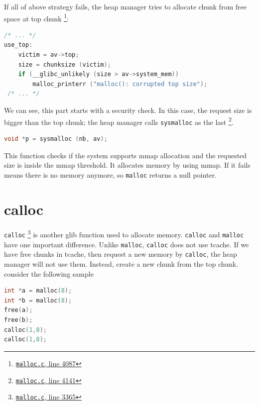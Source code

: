 \documentclass{masterthesis}
\newcommand*\tch{tcache}
\newcommand*\mallocc{\lstinline{malloc}}
\newcommand*\callocc{\lstinline{calloc}}
\begin{document}
If all of above strategy fails, the heap manager tries to allocate chunk from free space at top chunk \footnote{\href{https://sourceware.org/git/?p=glibc.git;a=blob;f=malloc/malloc.c;h=f7cd29bc2f93e1082ee77800bd64a4b2a2897055;hb=9ea3686266dca3f004ba874745a4087a89682617\#l4087}{\texttt{malloc.c}, line 4087}}:

\begin{lstlisting}[language=c,frame=tlrb]
 /* ... */
use_top:
	victim = av->top;
	size = chunksize (victim);
	if (__glibc_unlikely (size > av->system_mem))
		malloc_printerr ("malloc(): corrupted top size");
 /* ... */
\end{lstlisting}

We can see, this part starts with a security check. In this case, the request size is bigger than the top chunk; the heap manager calls \lstinline{sysmalloc} as the last \footnote{\href{https://sourceware.org/git/?p=glibc.git;a=blob;f=malloc/malloc.c;h=f7cd29bc2f93e1082ee77800bd64a4b2a2897055;hb=9ea3686266dca3f004ba874745a4087a89682617\#l4141}{\texttt{malloc.c}, line 4141}}.

\begin{lstlisting}[language=c,frame=tlrb]
 void *p = sysmalloc (nb, av);
 \end{lstlisting}

This function checks if the system supports mmap allocation and the requested size is inside the mmap threshold. It allocates memory by using mmap. If it fails means there is no memory anymore, so \mallocc{} returns a null pointer.

\section{calloc}
\callocc{} \footnote{\href{https://sourceware.org/git/?p=glibc.git;a=blob;f=malloc/malloc.c;h=f7cd29bc2f93e1082ee77800bd64a4b2a2897055;hb=9ea3686266dca3f004ba874745a4087a89682617\#l3365}{\texttt{malloc.c}, line 3365}} is another glib function used to allocate memory. \callocc{} and \mallocc{} have one important difference. Unlike \mallocc{}, \callocc{} does not use \tch{}. If we have free chunks in \tch{}, then request a new memory by \callocc{}, the heap manager will not use them. Instead, create a new chunk from the top chunk. consider the following sample

\begin{lstlisting}[language=c,frame=tlrb]
int *a = malloc(8);
int *b = malloc(8);
free(a);
free(b);
calloc(1,8);
calloc(1,8);
\end{lstlisting}
\end{document}
